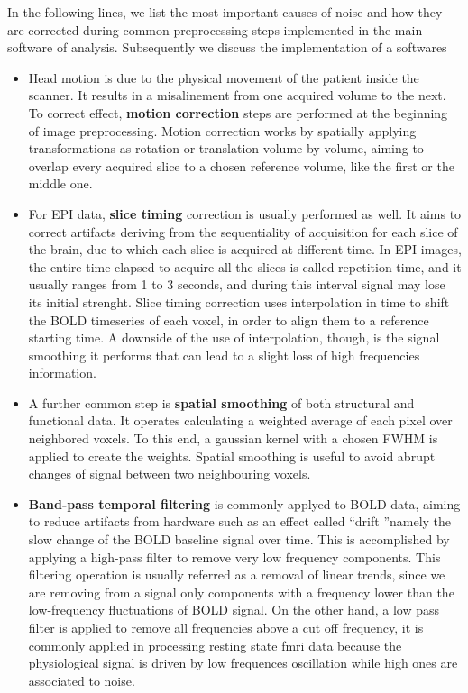 \documentclass[10pt]{report}
\begin{document}
In the following lines, we list the most important causes of noise and how they are corrected during common preprocessing steps implemented in the main software of analysis. Subsequently we discuss the implementation of a softwares
\begin{itemize}
\item Head motion is due to the physical movement of the patient inside the scanner. It results in a misalinement from one acquired volume to the next.
To correct effect, \textbf{motion correction} steps are performed at the beginning of image preprocessing. Motion correction works by spatially applying transformations as rotation or translation volume by volume, aiming to overlap every acquired slice to a chosen reference volume, like the first or the middle one.

\item For EPI data, \textbf{slice timing} correction is usually performed as well. It aims to correct artifacts deriving from the sequentiality of acquisition for each slice of the brain, due to which each slice is acquired at different time.
In EPI images, the entire time elapsed to acquire all the slices is called repetition-time, and it usually ranges from 1 to 3 seconds, and during this interval signal may lose its initial strenght.
Slice timing correction uses interpolation in time to shift the BOLD timeseries of each voxel, in order to align them to a reference starting time.
A downside of the use of interpolation, though, is the signal smoothing it performs that can lead to a slight loss of high frequencies information.

\item A further common step is \textbf{spatial smoothing} of both structural and functional data. It operates calculating a weighted average of each pixel over neighbored voxels. To this end, a gaussian kernel with a chosen FWHM is applied to create the weights.
Spatial smoothing is useful to avoid abrupt changes of signal between two neighbouring voxels.

\item \textbf{Band-pass temporal filtering} is commonly applyed to BOLD data, aiming to reduce artifacts from hardware such as an effect called \textquotedblleft drift \textquotedblright namely the slow change of the BOLD baseline signal over time. This is accomplished by applying a high-pass filter to remove very low frequency components. This filtering operation is usually referred as a removal of linear trends, since we are removing from a signal only components with a frequency lower than the low-frequency fluctuations of BOLD signal.
On the other hand, a low pass filter is applied to remove all frequencies above a cut off frequency, it is commonly applied in processing resting state fmri data because the physiological signal is driven by low frequences oscillation while high ones are associated to noise.

\end{itemize}
\end{document}
